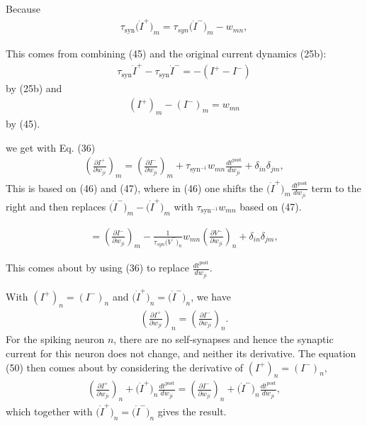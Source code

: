 \documentclass[a4paper]{article}
\newcommand{\blue}[1]{{\color{blue}#1}}
\begin{document}
\blue{
  Because
  \begin{align}
    \tau_{\text{syn}} \big(\dot{I}^+\big)_m =
    \tau_{syn}\big(\dot{I}^-\big)_m - w_{mn}, \tag{47}
  \end{align}
}

This comes from combining \blue{(45)} and the original current
dynamics \blue{(25b)}:
\begin{align}
  \tau_{\text{syn}} \dot{I}^+ - \tau_{\text{syn}} \dot{I}^- = -(I^+ -
  I^-)
\end{align}
by \blue{(25b)} and
\begin{align} 
(I^+)_m -  (I^-)_m = w_{mn}
\end{align}
by \blue{(45)}.

\blue{
  we get with Eq. (36)
  \begin{align}
    \left(\frac{\partial I^+}{\partial{w_{ji}}}\right)_m =
    \left(\frac{\partial I^-}{\partial w_{ji}}\right)_m +
    \tau_{\text{syn}^{-1}} w_{mn} \frac{d t^{\text{post}}}{d w_{ji}} +
    \delta_{in}\delta_{jm}, \tag{48} 
  \end{align}
}
This is based on \blue{(46)} and \blue{(47)}, where in \blue{(46)} one
shifts the $\big(\dot{I}^+\big)_m\frac{d t^{\text{post}}}{d w_{ji}}$
term to the right and then replaces $\big(\dot{I}^-\big)_m -
\big(\dot{I}^+\big)_m$ with $\tau_{\text{syn}^{-1}} w_{mn}$ based on \blue{(47)}.

\blue{
\begin{align}
  = \left(\frac{\partial I^-}{\partial w_{ji}}\right)_m -
  \frac{1}{\tau_{syn} \big(\dot{V}^-\big)_n} w_{mn}
  \left(\frac{\partial V^-}{\partial w_{ji}}\right)_n +
    \delta_{in}\delta_{jm}, \tag{49} 
\end{align}
}

This comes about by using \blue{(36)} to replace $\frac{d
  t^{\text{post}}}{d w_{ji}}$.

\blue{
  With $(I^+)_n = (I^-)_n$ and $\big(\dot{I}^+\big)_n =
  \big(\dot{I}^-\big)_n$, we have
  \begin{align}
    \left(\frac{\partial I^+}{\partial w_{ji}}\right)_n =
    \left(\frac{\partial I^-}{\partial w_{ji}}\right)_n. \tag{50}
  \end{align}
}
For the spiking neuron $n$, there are no self-synapses and hence the
synaptic current for this neuron does not change, and neither its
derivative. The equation \blue{(50)} then comes about by considering
the derivative of $(I^+)_n = (I^-)_n$,
\begin{align}
    \left(\frac{\partial I^+}{\partial w_{ji}}\right)_n +
    \big(\dot{I}^+\big)_n \frac{d t^{\text{post}}}{d w_{ji}} =
    \left(\frac{\partial I^-}{\partial w_{ji}}\right)_n  +
    \big(\dot{I}^-\big)_n \frac{d t^{\text{post}}}{d w_{ji}},
\end{align}
which together with $\big(\dot{I}^+\big)_n =
  \big(\dot{I}^-\big)_n$ gives the result.
\end{document}
